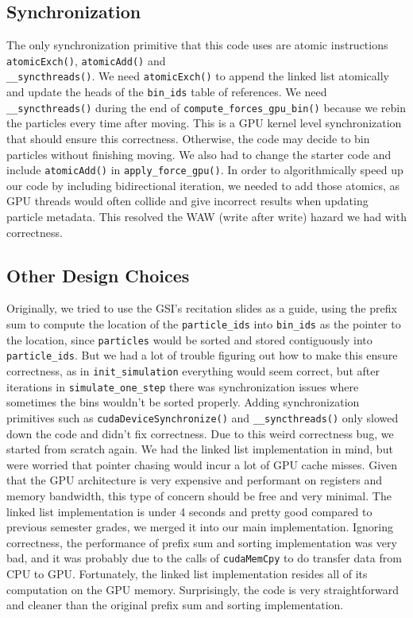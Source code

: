 \documentclass{article}
\begin{document}
\subsection{Synchronization}
The only synchronization primitive that this code uses are atomic instructions \verb|atomicExch()|, \verb|atomicAdd()| and \\ \verb|__syncthreads()|. We need \verb|atomicExch()| to append the linked list atomically and update the heads of the \verb|bin_ids| table of references. We need \verb|__syncthreads()| during the end of \verb|compute_forces_gpu_bin()| because we rebin the particles every time after moving. This is a GPU kernel level synchronization that should ensure this correctness. Otherwise, the code may decide to bin particles without finishing moving. We also had to change the starter code and include \verb|atomicAdd()| in \verb|apply_force_gpu()|. In order to algorithmically speed up our code by including bidirectional iteration, we needed to add those atomics, as GPU threads would often collide and give incorrect results when updating particle metadata. This resolved the WAW (write after write) hazard we had with correctness.

\subsection{Other Design Choices}
Originally, we tried to use the GSI's recitation slides as a guide, using the prefix sum to compute the location of the \verb|particle_ids| into \verb|bin_ids| as the pointer to the location, since \verb|particles| would be sorted and stored contiguously into \verb|particle_ids|. But we had a lot of trouble figuring out how to make this ensure correctness, as in \verb|init_simulation| everything would seem correct, but after iterations in \verb|simulate_one_step|  there was synchronization issues where sometimes the bins wouldn't be sorted properly. Adding synchronization primitives such as \verb|cudaDeviceSynchronize()| and \verb|__syncthreads()| only slowed down the code and didn't fix correctness. Due to this weird correctness bug, we started from scratch again. We had the linked list implementation in mind, but were worried that pointer chasing would incur a lot of GPU cache misses. Given that the GPU architecture is very expensive and performant on registers and memory bandwidth, this type of concern should be free and very minimal. The linked list implementation is under 4 seconds and pretty good compared to previous semester grades, we merged it into our main implementation. Ignoring correctness, the performance of prefix sum and sorting implementation was very bad, and it was probably due to the calls of \verb|cudaMemCpy| to do transfer data from CPU to GPU. Fortunately, the linked list implementation resides all of its computation on the GPU memory. Surprisingly, the code is very straightforward and cleaner than the original prefix sum and sorting implementation.
\end{document}
